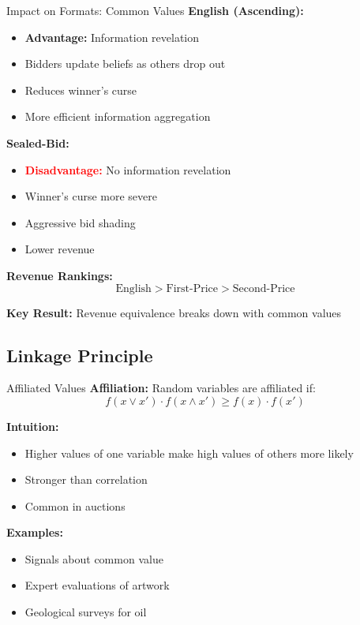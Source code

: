 \documentclass[xcolor={x11names}, aspectratio=169 ]{beamer}
\begin{document}
\begin{frame}{Impact on Formats: Common Values}
\textbf{English (Ascending):}
\begin{itemize}
  \item \textcolor{green!70!black}{\textbf{Advantage:}} Information revelation
  \item Bidders update beliefs as others drop out
  \item Reduces winner's curse
  \item More efficient information aggregation
\end{itemize}

\textbf{Sealed-Bid:}
\begin{itemize}
  \item \textcolor{red}{\textbf{Disadvantage:}} No information revelation
  \item Winner's curse more severe
  \item Aggressive bid shading
  \item Lower revenue
\end{itemize}

\textbf{Revenue Rankings:}
$$\text{English} > \text{First-Price} > \text{Second-Price}$$

\textbf{Key Result:} Revenue equivalence breaks down with common values
\end{frame}

\subsection{Linkage Principle}

\begin{frame}{Affiliated Values}
\textbf{Affiliation:} Random variables are affiliated if:
$$f(x \vee x') \cdot f(x \wedge x') \geq f(x) \cdot f(x')$$

\textbf{Intuition:}
\begin{itemize}
  \item Higher values of one variable make high values of others more likely
  \item Stronger than correlation
  \item Common in auctions
\end{itemize}

\textbf{Examples:}
\begin{itemize}
  \item Signals about common value
  \item Expert evaluations of artwork
  \item Geological surveys for oil
\end{itemize}
\end{frame}
\end{document}
